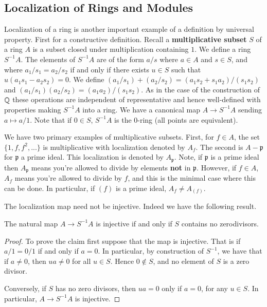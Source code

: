 \subsection{Localization of Rings and Modules}

Localization of a ring is another important example of a definition by universal property. First for a constructive definition. Recall a \textbf{multiplicative subset} $S$ of a ring $A$ is a subset closed under multiplication containing $1$. We define a ring $S^{-1}A$. The elements of $S^{-1}A$ are of the form $a/s$ where $a \in A$ and $s \in S$, and where $a_1/s_1 = a_2/s_2$ if and only if there exists $u \in S$ such that $u(a_1s_1-a_2s_2) = 0$. We define $(a_1/s_1)+(a_2/s_2) = (a_1s_2+s_1a_2)/(s_1s_2)$ and $(a_1/s_1)(a_2/s_2) = (a_1a_2)/(s_1s_2)$. As in the case of the construction of $\mathbb Q$ these operations are independent of representative and hence well-defined with properties making $S^{-1}A$ into a ring. We have a canonical map $A\rightarrow S^{-1}A$ sending $a\mapsto a/1$. Note that if $0 \in S$, $S^{-1}A$ is the $0$-ring (all points are equivalent).

We have two primary examples of multiplicative subsets. First, for $f \in A$, the set $\{1,f,f^2,...\}$ is multiplicative with localization denoted by $A_f$. The second is $A-\mathfrak{p}$ for $\mathfrak{p}$ a prime ideal. This localization is denoted by $A_{\mathfrak{p}}$. Note, if $\mathfrak{p}$ is a prime ideal then $A_{\mathfrak{p}}$ means you're allowed to divide by elements \textbf{not} in $\mathfrak{p}$. However, if $f \in A$, $A_f$ means you're allowed to divide by $f$, and this is the minimal case where this can be done. In particular, if $(f)$ is a prime ideal, $A_f \neq A_{(f)}$.

The localization map need not be injective. Indeed we have the following result.

\begin{claim}
    The natural map $A\rightarrow S^{-1}A$ is injective if and only if $S$ contains no zerodivisors.
\end{claim}
\begin{proof}
    To prove the claim first suppose that the map is injective. That is if $a/1 = 0/1$ if and only if $a = 0$. In particular, by construction of $S^{-1}$, we have that if $a \neq 0$, then $ua \neq 0$ for all $u \in S$. Hence $0 \notin S$, and no element of $S$ is a zero divisor.

    Conversely, if $S$ has no zero divisors, then $ua = 0$ only if $a = 0$, for any $u \in S$. In particular, $A\rightarrow S^{-1}A$ is injective.
\end{proof}

